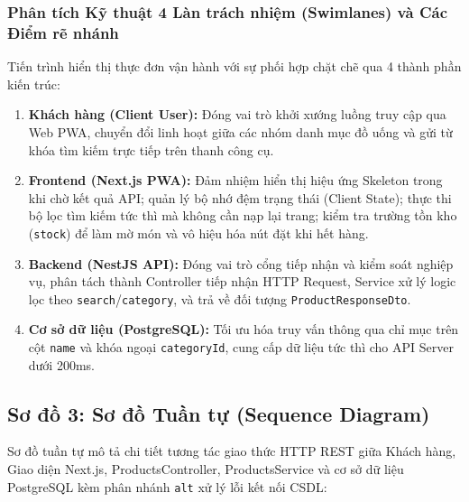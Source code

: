 \documentclass[a4paper]{article}
\begin{document}
\subsubsection{Phân tích Kỹ thuật 4 Làn trách nhiệm (Swimlanes) và Các Điểm rẽ nhánh}
Tiến trình hiển thị thực đơn vận hành với sự phối hợp chặt chẽ qua 4 thành phần kiến trúc:
\begin{enumerate}
    \item \textbf{Khách hàng (Client User):} Đóng vai trò khởi xướng luồng truy cập qua Web PWA, chuyển đổi linh hoạt giữa các nhóm danh mục đồ uống và gửi từ khóa tìm kiếm trực tiếp trên thanh công cụ.
    \item \textbf{Frontend (Next.js PWA):} Đảm nhiệm hiển thị hiệu ứng Skeleton trong khi chờ kết quả API; quản lý bộ nhớ đệm trạng thái (Client State); thực thi bộ lọc tìm kiếm tức thì mà không cần nạp lại trang; kiểm tra trường tồn kho (\texttt{stock}) để làm mờ món và vô hiệu hóa nút đặt khi hết hàng.
    \item \textbf{Backend (NestJS API):} Đóng vai trò cổng tiếp nhận và kiểm soát nghiệp vụ, phân tách thành Controller tiếp nhận HTTP Request, Service xử lý logic lọc theo \texttt{search}/\texttt{category}, và trả về đối tượng \texttt{ProductResponseDto}.
    \item \textbf{Cơ sở dữ liệu (PostgreSQL):} Tối ưu hóa truy vấn thông qua chỉ mục trên cột \texttt{name} và khóa ngoại \texttt{categoryId}, cung cấp dữ liệu tức thì cho API Server dưới 200ms.
\end{enumerate}

\subsection{Sơ đồ 3: Sơ đồ Tuần tự (Sequence Diagram)}
Sơ đồ tuần tự mô tả chi tiết tương tác giao thức HTTP REST giữa Khách hàng, Giao diện Next.js, ProductsController, ProductsService và cơ sở dữ liệu PostgreSQL kèm phân nhánh \texttt{alt} xử lý lỗi kết nối CSDL:
\end{document}
